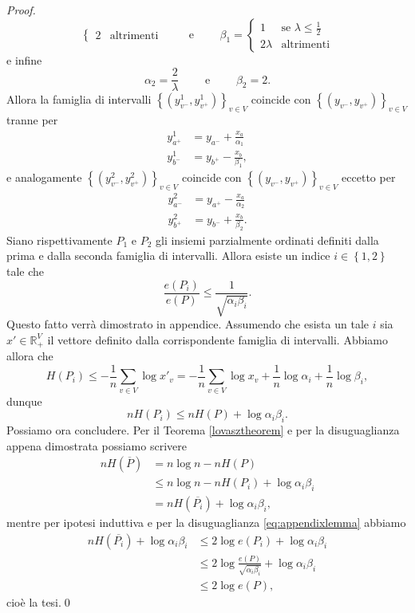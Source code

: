 \begin{proof}
\[\begin{cases}
		2 & \mbox{altrimenti} 
	\end{cases}
	\qquad\mbox{ e }\qquad \beta_1= 
	\begin{cases}
		1 & \mbox{se } \lambda\le\frac{1}{2} \\
		2\lambda & \mbox{altrimenti} 
	\end{cases}
	\]
	e infine
	\[\alpha_2=\frac{2}{\lambda}\qquad\mbox{ e }\qquad\beta_2=2.\]
	Allora la famiglia di intervalli \(\left\{\left(y_{v^-}^1, y_{v^+}^1\right)\right\}_{v\in V}\) coincide con \(\left\{\left(y_{v^-}, y_{v^+}\right)\right\}_{v\in V}\) tranne per 
	\begin{align}
		y_{a^+}^1 &= y_{a^-} + \frac{x_a}{\alpha_1} \nonumber \\
		y_{b^-}^1 &= y_{b^+} - \frac{x_b}{\beta_1}, \nonumber 
	\end{align}
	e analogamente \(\left\{\left(y_{v^-}^2, y_{v^+}^2\right)\right\}_{v\in V}\) coincide con \(\left\{\left(y_{v^-}, y_{v^+}\right)\right\}_{v\in V}\) eccetto per 
	\begin{align}
		y_{a^-}^2 &= y_{a^+} - \frac{x_a}{\alpha_2} \nonumber \\
		y_{b^+}^2 &= y_{b^-} + \frac{x_b}{\beta_2}. \nonumber 
	\end{align}
	Siano rispettivamente \(P_1\) e \(P_2\) gli insiemi parzialmente ordinati definiti dalla prima e dalla seconda famiglia di intervalli. Allora esiste un indice \(i\in\left\{1,2\right\}\) tale che 
	\begin{equation}
		\label{eq:appendixlemma} \frac{e(P_i)}{e(P)}\le\frac{1}{\sqrt{\alpha_i\beta_i}}. 
	\end{equation}
	Questo fatto verrà dimostrato in appendice. Assumendo che esista un tale \(i\) sia \(x'\in\mathbb{R}_{+}^V\) il vettore definito dalla corrispondente famiglia di intervalli. Abbiamo allora che
	\[H(P_i)\le-\frac{1}{n}\sum_{v\in V}{\log{x'_v}=-\frac{1}{n}\sum_{v\in V}{\log{x_v}}+\frac{1}{n}\log{\alpha_i}+\frac{1}{n}\log{\beta_i}},\]
	dunque
	\[nH(P_i)\le nH(P)+\log{\alpha_i\beta_i}.\]
	Possiamo ora concludere. Per il Teorema \ref{lovasztheorem} e per la disuguaglianza appena dimostrata possiamo scrivere 
	\begin{align}
		nH(\overline{P}) &= n\log{n}-nH(P) \nonumber \\
		&\le n\log{n}-nH(P_i)+\log{\alpha_i\beta_i} \nonumber \\
		&= nH(\overline{P_i})+\log{\alpha_i\beta_i}, \nonumber 
	\end{align}
	mentre per ipotesi induttiva e per la disuguaglianza \eqref{eq:appendixlemma} abbiamo 
	\begin{align}
		nH(\overline{P_i})+\log{\alpha_i\beta_i} &\le 2\log{e(P_i)}+\log{\alpha_i\beta_i} \nonumber \\
		&\le 2\log{\frac{e(P)}{\sqrt{\alpha_i\beta_i}}}+\log{\alpha_i\beta_i} \nonumber \\
		&\le 2\log{e(P)}, \nonumber 
	\end{align}
	cioè la tesi.\qed 
\end{proof}

